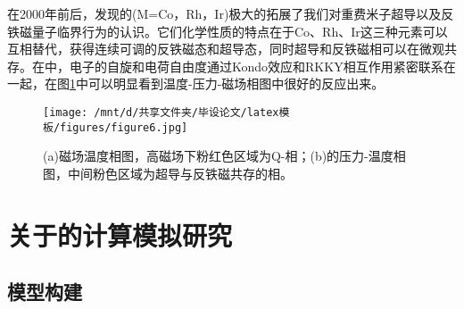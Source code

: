 在2000年前后，发现的(M=Co，Rh，Ir)极大的拓展了我们对重费米子超导以及反铁磁量子临界行为的认识。它们化学性质的特点在于Co、Rh、Ir这三种元素可以互相替代，获得连续可调的反铁磁态和超导态，同时超导和反铁磁相可以在微观共存。在中，电子的自旋和电荷自由度通过Kondo效应和RKKY相互作用紧密联系在一起，在图\ref{fig4}中可以明显看到温度-压力-磁场相图中很好的反应出来。
\begin{figure}[h]
    \centering
    \texttt{[image: /mnt/d/共享文件夹/毕设论文/latex模板/figures/figure6.jpg]}
    \caption{(a)磁场温度相图，高磁场下粉红色区域为Q-相；(b)的压力-温度相图，中间粉色区域为超导与反铁磁共存的相\cite{9}。}
    \label{fig4}
\end{figure}









\section{关于的计算模拟研究}
\subsection{模型构建}
